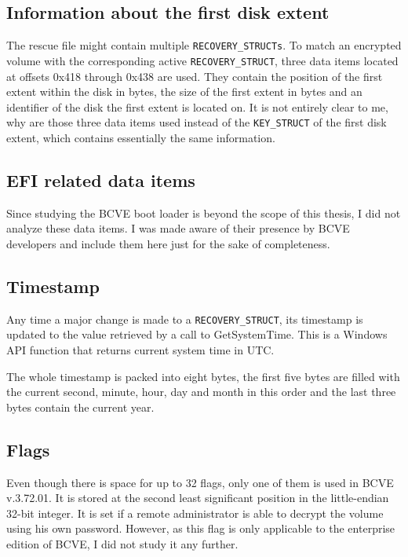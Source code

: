 \documentclass[thesis=B,english]{FITthesis}[2012/10/20]
\begin{document}
	\subsection{Information about the first disk extent}
	
	The rescue file might contain multiple \verb|RECOVERY_STRUCTs|. To match an encrypted volume with the corresponding active \verb|RECOVERY_STRUCT|, three data items located at offsets 0x418 through 0x438 are used. They contain the position of the first extent within the disk in bytes, the size of the first extent in bytes and an identifier of the disk the first extent is located on. It is not entirely clear to me, why are those three data items used instead of the \verb|KEY_STRUCT| of the first disk extent, which contains essentially the same information.
	
	\subsection{EFI related data items}
	
	Since studying the BCVE boot loader is beyond the scope of this thesis, I did not analyze these data items. I was made aware of their presence by BCVE developers and include them here just for the sake of completeness.
	
	\subsection{Timestamp}
	
	Any time a major change is made to a \verb|RECOVERY_STRUCT|, its timestamp is updated to the value retrieved by a call to GetSystemTime. This is a Windows API function that returns current system time in UTC. 
	
	The whole timestamp is packed into eight bytes, the first five bytes are filled with the current second, minute, hour, day and month in this order and the last three bytes contain the current year.
	
	\subsection{Flags}
	
	Even though there is space for up to 32 flags, only one of them is used in BCVE v.3.72.01. It is stored at the second least significant position in the little-endian 32-bit integer. It is set if a remote administrator is able to decrypt the volume using his own password. However, as this flag is only applicable to the enterprise edition of BCVE, I did not study it any further.
	
\end{document}
